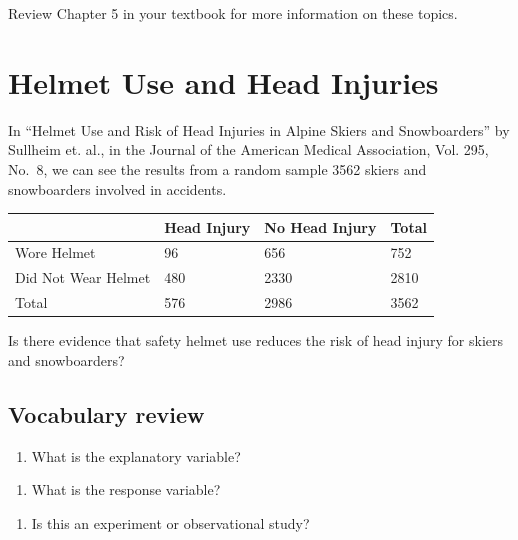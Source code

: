 \documentclass[
]{report}
\providecommand{\tightlist}{%
  \setlength{\itemsep}{0pt}\setlength{\parskip}{0pt}}
\begin{document}
Review Chapter 5 in your textbook for more information on these topics.

\hypertarget{helmet-use-and-head-injuries-1}{%
\section{Helmet Use and Head Injuries}\label{helmet-use-and-head-injuries-1}}

In ``Helmet Use and Risk of Head Injuries in Alpine Skiers and Snowboarders'' by Sullheim et. al., in the Journal of the American Medical Association, Vol. 295, No.~8, we can see the results from a random sample 3562 skiers and snowboarders involved in accidents.

\begin{longtable}[]{@{}llll@{}}
\toprule
& Head Injury & No Head Injury & Total\tabularnewline
\midrule
\endhead
Wore Helmet & 96 & 656 & 752\tabularnewline
Did Not Wear Helmet & 480 & 2330 & 2810\tabularnewline
Total & 576 & 2986 & 3562\tabularnewline
\bottomrule
\end{longtable}

Is there evidence that safety helmet use reduces the risk of head injury for skiers and snowboarders?

\hypertarget{vocabulary-review}{%
\subsection{Vocabulary review}\label{vocabulary-review}}

\begin{enumerate}
\def\labelenumi{\arabic{enumi}.}
\tightlist
\item
  What is the explanatory variable?
\end{enumerate}

\vspace{0.5in}

\begin{enumerate}
\def\labelenumi{\arabic{enumi}.}
\setcounter{enumi}{1}
\tightlist
\item
  What is the response variable?
\end{enumerate}

\vspace{0.5in}

\begin{enumerate}
\def\labelenumi{\arabic{enumi}.}
\setcounter{enumi}{2}
\tightlist
\item
  Is this an experiment or observational study?
\end{enumerate}
\end{document}
